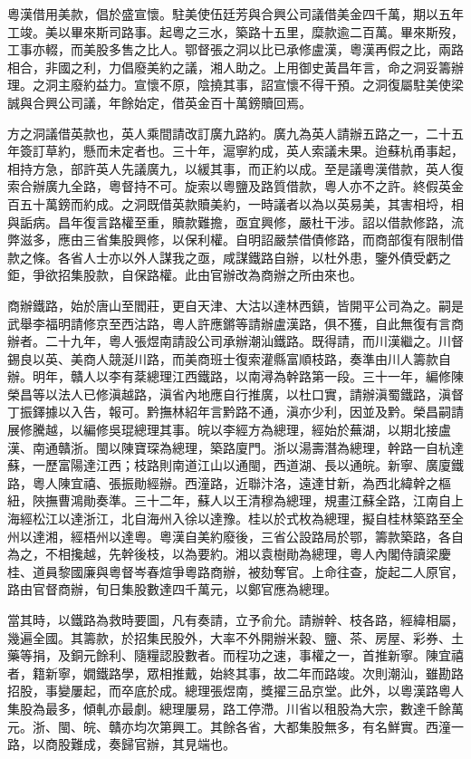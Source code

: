 \begin{pinyinscope}
粵漢借用美款，倡於盛宣懷。駐美使伍廷芳與合興公司議借美金四千萬，期以五年工竣。美以畢來斯司路事。起粵之三水，築路十五里，糜款逾二百萬。畢來斯歿，工事亦輟，而美股多售之比人。鄂督張之洞以比已承修盧漢，粵漢再假之比，兩路相合，非國之利，力倡廢美約之議，湘人助之。上用御史黃昌年言，命之洞妥籌辦理。之洞主廢約益力。宣懷不原，陰撓其事，詔宣懷不得干預。之洞復屬駐美使梁誠與合興公司議，年餘始定，借英金百十萬鎊贖回焉。

方之洞議借英款也，英人乘間請改訂廣九路約。廣九為英人請辦五路之一，二十五年簽訂草約，懸而未定者也。三十年，滬寧約成，英人索議未果。迨蘇杭甬事起，相持方急，部許英人先議廣九，以緩其事，而正約以成。至是議粵漢借款，英人復索合辦廣九全路，粵督持不可。旋索以粵鹽及路質借款，粵人亦不之許。終假英金百五十萬鎊而約成。之洞既借英款贖美約，一時議者以為以英易美，其害相埒，相與詬病。昌年復言路權至重，贖款難擔，亟宜興修，嚴杜干涉。詔以借款修路，流弊滋多，應由三省集股興修，以保利權。自明詔嚴禁借債修路，而商部復有限制借款之條。各省人士亦以外人謀我之亟，咸謀鐵路自辦，以杜外患，鑒外債受虧之鉅，爭欲招集股款，自保路權。此由官辦改為商辦之所由來也。

商辦鐵路，始於唐山至閻莊，更自天津、大沽以達林西鎮，皆開平公司為之。嗣是武舉李福明請修京至西沽路，粵人許應鏘等請辦盧漢路，俱不獲，自此無復有言商辦者。二十九年，粵人張煜南請設公司承辦潮汕鐵路。既得請，而川漢繼之。川督錫良以英、美商人競涎川路，而美商班士復索灌縣富順枝路，奏準由川人籌款自辦。明年，贛人以李有棻總理江西鐵路，以南潯為幹路第一段。三十一年，編修陳榮昌等以法人已修滇越路，滇省內地應自行推廣，以杜口實，請辦滇蜀鐵路，滇督丁振鐸據以入告，報可。黔撫林紹年言黔路不通，滇亦少利，因並及黔。榮昌嗣請展修騰越，以編修吳琨總理其事。皖以李經方為總理，經始於蕪湖，以期北接盧漢、南通贛浙。閩以陳寶琛為總理，築路廈門。浙以湯壽潛為總理，幹路一自杭達蘇，一歷富陽達江西；枝路則南道江山以通閩，西道湖、長以通皖。新寧、廣廈鐵路，粵人陳宜禧、張振勛經辦。西潼路，近聯汴洛，遠達甘新，為西北緯幹之樞紐，陜撫曹鴻勛奏準。三十二年，蘇人以王清穆為總理，規畫江蘇全路，江南自上海經松江以達浙江，北自海州入徐以達豫。桂以於式枚為總理，擬自桂林築路至全州以達湘，經梧州以達粵。粵漢自美約廢後，三省公設路局於鄂，籌款築路，各自為之，不相攙越，先幹後枝，以為要約。湘以袁樹勛為總理，粵人內閣侍讀梁慶桂、道員黎國廉與粵督岑春煊爭粵路商辦，被劾奪官。上命往查，旋起二人原官，路由官督商辦，旬日集股數達四千萬元，以鄭官應為總理。

當其時，以鐵路為救時要圖，凡有奏請，立予俞允。請辦幹、枝各路，經緯相屬，幾遍全國。其籌款，於招集民股外，大率不外開辦米穀、鹽、茶、房屋、彩券、土藥等捐，及銅元餘利、隨糧認股數者。而程功之速，事權之一，首推新寧。陳宜禧者，籍新寧，嫺鐵路學，眾相推戴，始終其事，故二年而路竣。次則潮汕，雖勘路招股，事變屢起，而卒底於成。總理張煜南，獎擢三品京堂。此外，以粵漢路粵人集股為最多，傾軋亦最劇。總理屢易，路工停滯。川省以租股為大宗，數達千餘萬元。浙、閩、皖、贛亦均次第興工。其餘各省，大都集股無多，有名鮮實。西潼一路，以商股難成，奏歸官辦，其見端也。


\end{pinyinscope}
